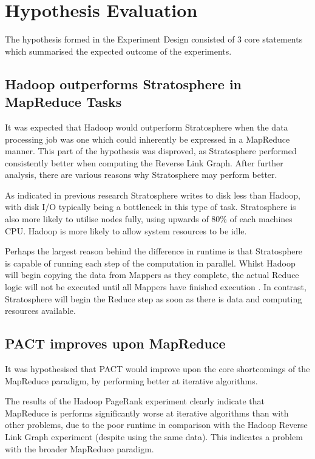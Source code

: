 \section{Hypothesis Evaluation}
\label{Hypothesis Evaluation}
The hypothesis formed in the Experiment Design consisted of 3 core statements which summarised the expected outcome of the experiments.

\subsection{Hadoop outperforms Stratosphere in MapReduce Tasks}
It was expected that Hadoop would outperform Stratosphere when the data processing job was one which could inherently be expressed in a MapReduce manner. This part of the hypothesis was disproved, as Stratosphere performed consistently better when computing the Reverse Link Graph. After further analysis, there are various reasons why Stratosphere may perform better.

As indicated in previous research \cite{warneke2011exploiting}\cite{battre2010socc} Stratosphere writes to disk less than Hadoop, with disk I/O typically being a bottleneck in this type of task. Stratosphere is also more likely to utilise nodes fully, using upwards of 80\% of each machines CPU. Hadoop is more likely to allow system resources to be idle. 

Perhaps the largest reason behind the difference in runtime is that Stratosphere is capable of running each step of the computation in parallel. Whilst Hadoop will begin copying the data from Mappers as they complete, the actual Reduce logic will not be executed until all Mappers have finished execution \cite{white2009hadoop}. In contrast, Stratosphere will begin the Reduce step as soon as there is data and computing resources available.

\subsection{PACT improves upon MapReduce}
It was hypothesised that PACT would improve upon the core shortcomings of the MapReduce paradigm, by performing better at iterative algorithms.

The results of the Hadoop PageRank experiment clearly indicate that MapReduce is performs significantly worse at iterative algorithms than with other problems, due to the poor runtime in comparison with the Hadoop Reverse Link Graph experiment (despite using the same data). This indicates a problem with the broader MapReduce paradigm. 

